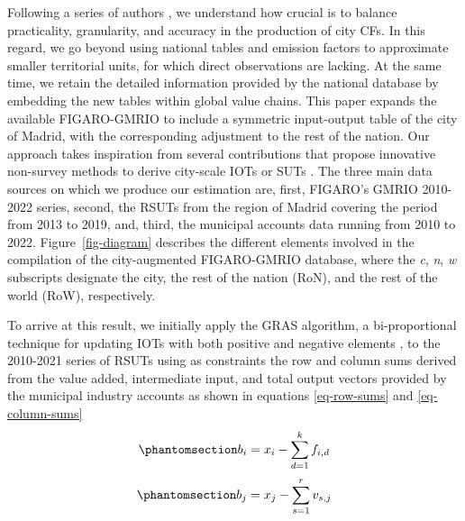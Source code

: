 \documentclass[
  10pt,
  twocolumn]{aft}
\begin{document}
Following a series of authors
\citep[e.g.][]{corcoles_carbon_2024, wiedmann_threescope_2021}, we
understand how crucial is to balance practicality, granularity, and
accuracy in the production of city CFs. In this regard, we go beyond
using national tables and emission factors to approximate smaller
territorial units, for which direct observations are lacking. At the
same time, we retain the detailed information provided by the national
database by embedding the new tables within global value chains. This
paper expands the available FIGARO-GMRIO to include a symmetric
input-output table of the city of Madrid, with the corresponding
adjustment to the rest of the nation. Our approach takes inspiration
from several contributions that propose innovative non-survey methods to
derive city-scale IOTs or SUTs
\citep[see][]{wiedmann_threescope_2021, moran_carbon_2018, zheng_entropy-based_2022, wiedmann_concept_2016}.
The three main data sources on which we produce our estimation are,
first, FIGARO's GMRIO 2010-2022 series, second, the RSUTs from the
region of Madrid covering the period from 2013 to 2019, and, third, the
municipal accounts data running from 2010 to 2022.
Figure~\ref{fig-diagram} describes the different elements involved in
the compilation of the city-augmented FIGARO-GMRIO database, where the
\textit{c}, \textit{n}, \textit{w} subscripts designate the city, the
rest of the nation (RoN), and the rest of the world (RoW), respectively.

To arrive at this result, we initially apply the GRAS algorithm, a
bi-proportional technique for updating IOTs with both positive and
negative elements
\citep{temurshoev_note_2013, lenzen_comments_2007, junius_solution_2003},
to the 2010-2021 series of RSUTs using as constraints the row and column
sums derived from the value added, intermediate input, and total output
vectors provided by the municipal industry accounts as shown in
equations \ref{eq-row-sums} and \ref{eq-column-sums} \vspace{-3pt}
\begin{equation}\phantomsection\label{eq-row-sums}{ b_i = x_i - \sum^k_{d=1} f_{i,d} }\end{equation}
\begin{equation}\phantomsection\label{eq-column-sums}{ b_j = x_j - \sum^r_{s=1} v_{s,j} }\end{equation}
\end{document}
